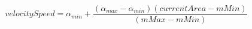 \documentclass[10pt]{book}
\begin{document}
\begin{mdSnippets}
\begin{mdDisplaySnippet}[524327b7ef66984f15e0d023603e4f2c]
\end{mdDisplaySnippet}%
\begin{mdDisplaySnippet}%
\begin{mdDiv}[class={mathdisplay,math-display},color={},math-needpdf={}]%
\[%
velocitySpeed = \alpha_{min} + \frac{(\alpha_{max} - \alpha_{min})(currentArea - mMin)} {(mMax - mMin)}
\]%
\end{mdDiv}%


\end{mdDisplaySnippet}
\end{mdSnippets}
\end{document}
